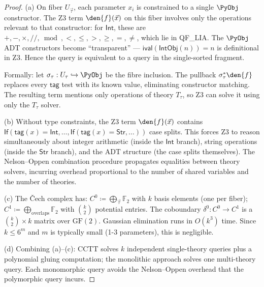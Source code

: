 \begin{proof}
(a) On fiber $U_{\vec{\tau}}$, each parameter $x_i$ is constrained
to a single $\PyObj$ constructor.  The Z3 term
$\den{f}(\vec{x})$ on this fiber involves only the operations
relevant to that constructor: for $\mathsf{Int}$, these are
$+, -, \times, //, \bmod, <, \leq, >, \geq, =, \neq$, which lie in
QF\_LIA.  The $\PyObj$ ADT constructors become ``transparent'' —
$\mathsf{ival}(\mathsf{IntObj}(n)) = n$ is definitional in Z3.
Hence the query is equivalent to a query in the single-sorted fragment.

Formally: let $\sigma_\tau : U_\tau \hookrightarrow \PyObj$ be the
fibre inclusion.  The pullback $\sigma_\tau^* \den{f}$ replaces every
$\mathsf{tag}$ test with its known value, eliminating constructor
matching.  The resulting term mentions only operations of theory
$T_\tau$, so Z3 can solve it using only the $T_\tau$ solver.

(b) Without type constraints, the Z3 term $\den{f}(\vec{x})$
contains $\mathsf{If}(\mathsf{tag}(x) = \mathsf{Int}, \ldots,
\mathsf{If}(\mathsf{tag}(x) = \mathsf{Str}, \ldots))$ case splits.
This forces Z3 to reason simultaneously about integer arithmetic
(inside the $\mathsf{Int}$ branch), string operations (inside the
$\mathsf{Str}$ branch), and the ADT structure (the case splits
themselves).  The Nelson--Oppen combination procedure propagates
equalities between theory solvers, incurring overhead proportional
to the number of shared variables and the number of theories.

(c) The \v{C}ech complex has:
$C^0 \coloneqq \bigoplus_{\vec{\tau}} \mathbb{F}_2$ with $k$ basis
elements (one per fiber);
$C^1 \coloneqq \bigoplus_{\text{overlaps}} \mathbb{F}_2$ with
$\binom{k}{2}$ potential entries.
The coboundary $\delta^0 : C^0 \to C^1$ is a $\binom{k}{2} \times k$
matrix over $\mathrm{GF}(2)$.  Gaussian elimination runs in
$O(k^3)$ time.  Since $k \leq 6^m$ and $m$ is typically small
(1-3 parameters), this is negligible.

(d) Combining (a)--(c): CCTT solves $k$ independent single-theory
queries plus a polynomial gluing computation; the monolithic approach
solves one multi-theory query.  Each monomorphic query avoids the
Nelson--Oppen overhead that the polymorphic query incurs.
\end{proof}

